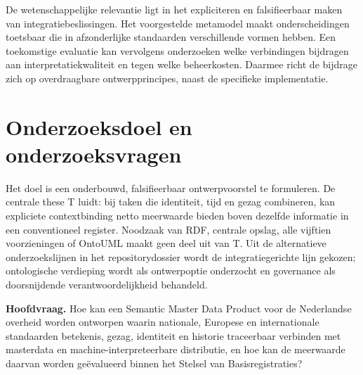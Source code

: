 De wetenschappelijke relevantie ligt in het expliciteren en falsifieerbaar maken van integratiebeslissingen. Het voorgestelde metamodel maakt onderscheidingen toetsbaar die in afzonderlijke standaarden verschillende vormen hebben. Een toekomstige evaluatie kan vervolgens onderzoeken welke verbindingen bijdragen aan interpretatiekwaliteit en tegen welke beheerkosten. Daarmee richt de bijdrage zich op overdraagbare ontwerpprincipes, naast de specifieke implementatie. \citep{L01,L03,L04}

\section{Onderzoeksdoel en onderzoeksvragen}
\label{sec:questions}
Het doel is een onderbouwd, falsifieerbaar ontwerpvoorstel te formuleren. De centrale these T luidt: bij taken die identiteit, tijd en gezag combineren, kan expliciete contextbinding netto meerwaarde bieden boven dezelfde informatie in een conventioneel register. Noodzaak van RDF, centrale opslag, alle vijftien voorzieningen of OntoUML maakt geen deel uit van T. Uit de alternatieve onderzoekslijnen in het repositorydossier wordt de integratiegerichte lijn gekozen; ontologische verdieping wordt als ontwerpoptie onderzocht en governance als doorsnijdende verantwoordelijkheid behandeld.

\noindent\textbf{Hoofdvraag.} Hoe kan een Semantic Master Data Product voor de Nederlandse overheid worden ontworpen waarin nationale, Europese en internationale standaarden betekenis, gezag, identiteit en historie traceerbaar verbinden met masterdata en machine-interpreteerbare distributie, en hoe kan de meerwaarde daarvan worden geëvalueerd binnen het Stelsel van Basisregistraties?

